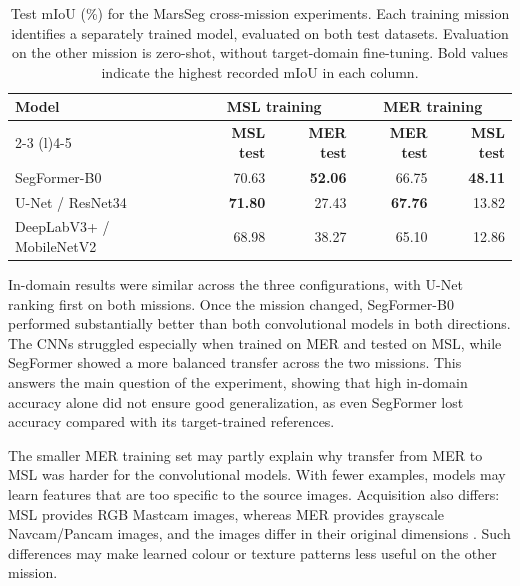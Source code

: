 \begin{table}[ht!]
    \centering
    \small
    \setlength{\tabcolsep}{5pt}
    \begin{tabular}{@{}l r r r r@{}}
        \toprule
        \textbf{Model}                            &
        \multicolumn{2}{c}{\textbf{MSL training}} &
        \multicolumn{2}{c}{\textbf{MER training}}                                                                                 \\
        \cmidrule(lr){2-3}
        \cmidrule(l){4-5}
                                                  & \textbf{MSL test} & \textbf{MER test} & \textbf{MER test} & \textbf{MSL test} \\
        \midrule
        \midrule
        SegFormer-B0                              & 70.63             & \textbf{52.06}    & 66.75             & \textbf{48.11}    \\
        U-Net / ResNet34                          & \textbf{71.80}    & 27.43             & \textbf{67.76}    & 13.82             \\
        DeepLabV3+ / MobileNetV2                  & 68.98             & 38.27             & 65.10             & 12.86             \\
        \bottomrule
    \end{tabular}
    \vspace{5mm}
    \caption{Test mIoU (\%) for the MarsSeg cross-mission experiments. Each training mission identifies a separately trained model, evaluated on both test datasets. Evaluation on the other mission is zero-shot, without target-domain fine-tuning. Bold values indicate the highest recorded mIoU in each column.}
    \label{tab:marsseg-cross-mission-accuracy}
\end{table}

In-domain results were similar across the three configurations, with U-Net ranking first on both missions. Once the mission changed, SegFormer-B0 performed substantially better than both convolutional models in both directions. The CNNs struggled especially when trained on MER and tested on MSL, while SegFormer showed a more balanced transfer across the two missions. This answers the main question of the experiment, showing that high in-domain accuracy alone did not ensure good generalization, as even SegFormer lost accuracy compared with its target-trained references.

The smaller MER training set may partly explain why transfer from MER to MSL was harder for the convolutional models. With fewer examples, models may learn features that are too specific to the source images. Acquisition also differs: MSL provides RGB Mastcam images, whereas MER provides grayscale Navcam/Pancam images, and the images differ in their original dimensions \cite{purohit2025marsbench}. Such differences may make learned colour or texture patterns less useful on the other mission.

